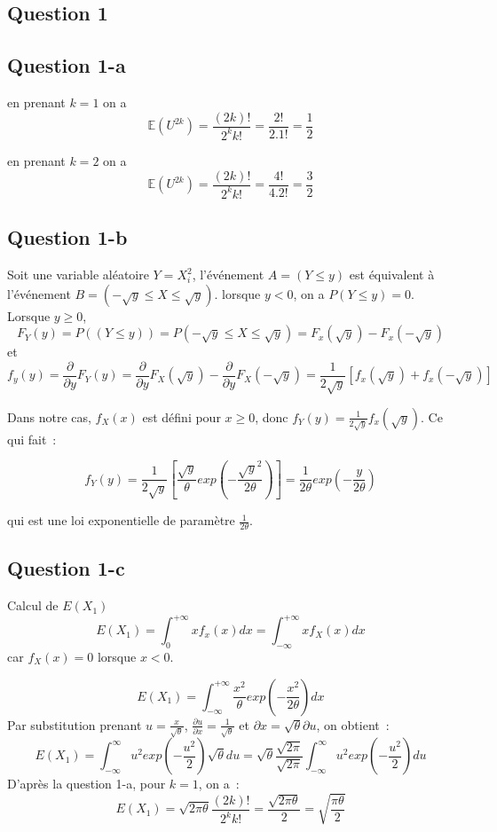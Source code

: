 \documentclass[]{book}
\theoremstyle{definition}
\begin{document}
\subsection*{Question 1}
\subsection*{Question 1-a}

en prenant $k=1$ on a 
$$\mathbb{E}(U^{2k}) = \frac{(2k)!}{2^kk!} = \frac{2!}{2.1!} = \frac{1}{2}$$

en prenant $k=2$ on a 
$$\mathbb{E}(U^{2k}) = \frac{(2k)!}{2^kk!} = \frac{4!}{4.2!} = \frac{3}{2}$$

\subsection*{Question 1-b}
Soit une variable al\'eatoire $Y = X_i^2$, l'\'ev\'enement $A = (Y \leq y)$ est \'equivalent \`a l'\'ev\'enement $B = (-\sqrt{y} \leq X \leq \sqrt{y})$. lorsque $y < 0$, on a $P(Y \leq y)=0$.
Lorsque $y \geq 0$,
$$
F_{Y}(y) = P( (Y \leq y)) = P (-\sqrt{y} \leq X \leq \sqrt{y}) = F_{x}(\sqrt{y}) - F_{x}(-\sqrt{y})
$$
et
$$
f_{y}(y) = \frac{\partial}{\partial y} F_{Y}(y) = \frac{\partial}{\partial y} F_{X}(\sqrt{y}) - \frac{\partial}{\partial y} F_{X}(-\sqrt{y}) = \frac{1}{2\sqrt{y}}[f_{x}(\sqrt{y}) + f_{x}(-\sqrt{y})]
$$

Dans notre cas, $f_{X}(x)$ est d\'efini pour $x \geq 0$, donc $f_{Y}(y)=\frac{1}{2\sqrt{y}}f_{x}(\sqrt{y})$. Ce qui fait~:

$$
f_{Y}(y) = \frac{1}{2\sqrt{y}} \left[ \frac{\sqrt{y}}{\theta}exp \left( -\frac{\sqrt{y}^2}{2\theta} \right) \right] = \frac{1}{2\theta} exp \left( -\frac{y}{2\theta} \right)
$$

qui est une loi exponentielle de param\`etre $\frac{1}{2\theta}$.

\subsection*{Question 1-c}
Calcul de $E(X_1)$
$$
E(X_1) = \int_{0}^{+\infty} x f_{x}(x) dx = \int_{-\infty}^{+\infty} x f_{X}(x) dx
$$
car $f_{X}(x) = 0$ lorsque $x < 0$.

$$
E(X_1) = \int_{-\infty}^{+\infty} \frac{x^2}{\theta} exp \left( -\frac{x^2}{2\theta}\right) dx
$$
Par substitution prenant $u = \frac{x}{\sqrt{\theta}}$, $\frac{\partial u}{\partial x} = \frac{1}{\sqrt{\theta}}$ et ${\partial x} = \sqrt{\theta}{\partial u}$, on obtient~:
$$
E(X_1) = \int_{-\infty}^{\infty} u^2 exp \left( -\frac{u^2}{2}\right) \sqrt{\theta} du = \sqrt{\theta} \frac{\sqrt{2\pi}}{\sqrt{2\pi}} \int_{-\infty}^{\infty} u^2 exp \left( -\frac{u^2}{2}\right)  du 
$$
D'apr\`es la question 1-a, pour $k=1$, on a~:
$$
E(X_1) = \sqrt{2\pi\theta}\frac{(2k)!}{2^k k!} = \frac{\sqrt{2\pi\theta}}{2} = \sqrt{\frac{\pi\theta}{2}}
$$
\end{document}
